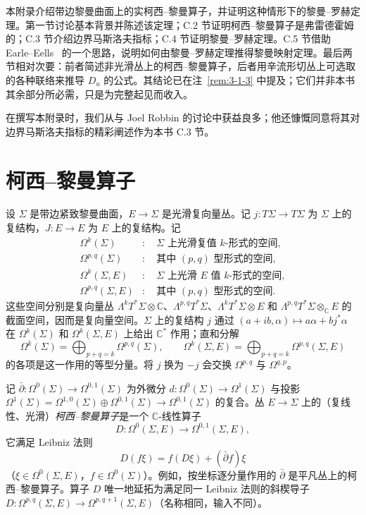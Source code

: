 
本附录介绍带边黎曼曲面上的实柯西–黎曼算子，并证明这种情形下的黎曼--罗赫定理。第一节讨论基本背景并陈述该定理；C.2 节证明柯西–黎曼算子是弗雷德霍姆的；C.3 节介绍边界马斯洛夫指标；C.4 节证明黎曼--罗赫定理。C.5 节借助 Earle--Eells~ 的一个思路，说明如何由黎曼--罗赫定理推得黎曼映射定理。最后两节相对次要：前者简述非光滑丛上的柯西–黎曼算子，后者用辛流形切丛上可选取的各种联络来推导 $D_u$ 的公式。其结论已在注~\ref{rem:3-1-3} 中提及；它们并非本书其余部分所必需，只是为完整起见而收入。

在撰写本附录时，我们从与 Joel Robbin 的讨论中获益良多；他还慷慨同意将其对边界马斯洛夫指标的精彩阐述作为本书 C.3 节。

\section{柯西–黎曼算子}\label{sec:C-1}

设 $\Sigma$ 是带边紧致黎曼曲面，$E\to\Sigma$ 是光滑复向量丛。记 $j:T\Sigma\to T\Sigma$ 为 $\Sigma$ 上的复结构，$J:E\to E$ 为 $E$ 上的复结构。记
\[
\begin{aligned}
\Omega^k(\Sigma)&:\quad \Sigma\text{ 上光滑复值 $k$-形式的空间},\\
\Omega^{p,q}(\Sigma)&:\quad\text{其中 $(p,q)$ 型形式的空间},\\
\Omega^k(\Sigma,E)&:\quad\Sigma\text{ 上光滑 $E$ 值 $k$-形式的空间},\\
\Omega^{p,q}(\Sigma,E)&:\quad\text{其中 $(p,q)$ 型形式的空间}.
\end{aligned}
\]
这些空间分别是复向量丛 $\Lambda^kT^*\Sigma\otimes\mathbb C$、$\Lambda^{p,q}T^*\Sigma$、$\Lambda^kT^*\Sigma\otimes E$ 和 $\Lambda^{p,q}T^*\Sigma\otimes_{\mathbb C}E$ 的截面空间，因而是复向量空间。$\Sigma$ 上的复结构 $j$ 通过 $(a+ib,\alpha)\mapsto a\alpha+bj^*\alpha$ 在 $\Omega^k(\Sigma)$ 和 $\Omega^k(\Sigma,E)$ 上给出 $\mathbb C^*$ 作用；直和分解
\[
  \Omega^k(\Sigma)=\bigoplus_{p+q=k}\Omega^{p,q}(\Sigma),\qquad
  \Omega^k(\Sigma,E)=\bigoplus_{p+q=k}\Omega^{p,q}(\Sigma,E)
\]
的各项是这一作用的等型分量。将 $j$ 换为 $-j$ 会交换 $\Omega^{p,q}$ 与 $\Omega^{q,p}$。

记 $\bar\partial:\Omega^0(\Sigma)\to\Omega^{0,1}(\Sigma)$ 为外微分 $d:\Omega^0(\Sigma)\to\Omega^1(\Sigma)$ 与投影 $\Omega^1(\Sigma)=\Omega^{1,0}(\Sigma)\oplus\Omega^{0,1}(\Sigma)\to\Omega^{0,1}(\Sigma)$ 的复合。丛 $E\to\Sigma$ 上的（复线性、光滑）\emph{柯西–黎曼算子}是一个 $\mathbb C$-线性算子
\[
  D:\Omega^0(\Sigma,E)\longrightarrow\Omega^{0,1}(\Sigma,E),
\]
它满足 Leibniz 法则
\[
  D(f\xi)=f(D\xi)+(\bar\partial f)\xi
\]
（$\xi\in\Omega^0(\Sigma,E)$，$f\in\Omega^0(\Sigma)$）。例如，按坐标逐分量作用的 $\bar\partial$ 是平凡丛上的柯西–黎曼算子。算子 $D$ 唯一地延拓为满足同一 Leibniz 法则的斜楔导子 $D:\Omega^{p,q}(\Sigma,E)\to\Omega^{p,q+1}(\Sigma,E)$（名称相同，输入不同）。

